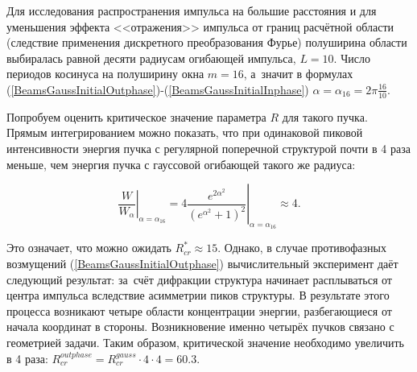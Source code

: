Для исследования распространения импульса на большие расстояния и для уменьшения эффекта <<отражения>> импульса
от границ расчётной области (следствие применения дискретного преобразования Фурье) полуширина области выбиралась равной десяти радиусам
огибающей импульса, $L = 10$. Число периодов косинуса на полуширину окна $m = 16$,
а~значит в формулах (\ref{BeamsGaussInitialOutphase})-(\ref{BeamsGaussInitialInphase}) $\alpha = \alpha_{16} = 2 \pi \frac{16}{10}$.


Попробуем оценить критическое значение параметра $R$ для такого пучка. Прямым интегрированием можно показать, что при одинаковой
пиковой интенсивности энергия пучка с регулярной поперечной структурой почти в 4 раза меньше, чем энергия пучка с гауссовой огибающей такого же радиуса:

\begin{equation}
\left. \frac{W}{W_{\alpha}} \right|_{\alpha = \alpha_{16}} = \left. 4 \frac{e^{2\alpha^2}}{(e^{\alpha^2} + 1)^2} \right|_{\alpha = \alpha_{16}} \approx 4.
\end{equation}

Это означает, что можно ожидать $R_{cr}^{*} \approx 15$. Однако, в случае противофазных возмущений (\ref{BeamsGaussInitialOutphase})
вычислительный эксперимент даёт следующий результат:
за~счёт дифракции структура начинает расплываться от центра импульса вследствие асимметрии пиков структуры.
В результате этого процесса возникают четыре области концентрации энергии, разбегающиеся
от начала координат в стороны. Возникновение именно четырёх пучков связано с геометрией задачи.
Таким образом, критической значение необходимо увеличить в 4 раза:  $R_{cr}^{outphase} = R_{cr}^{gauss} \cdot 4 \cdot 4 = 60.3$.


